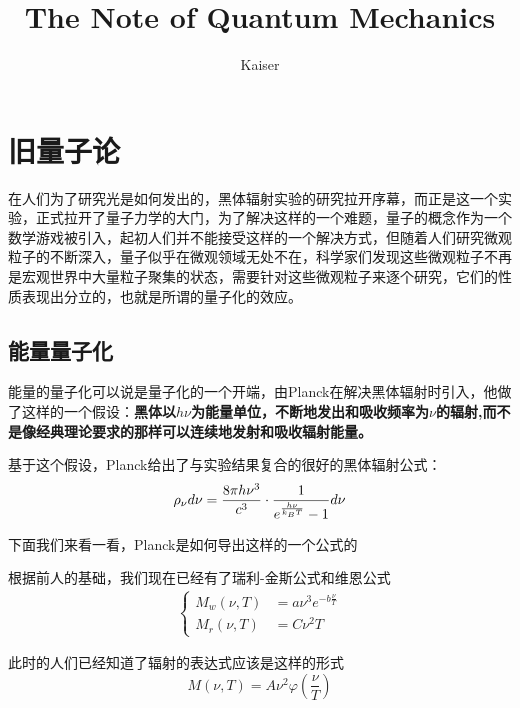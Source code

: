 \documentclass{article}
\title{The Note of Quantum Mechanics}
\author{Kaiser}
\begin{document}
\maketitle

\begin{center}
    \tableofcontents
\end{center}








\newpage





\section{旧量子论}




在人们为了研究光是如何发出的，黑体辐射实验的研究拉开序幕，而正是这一个实验，正式拉开了量子力学的大门，为了解决这样的一个难题，量子的概念作为一个数学游戏被引入，起初人们并不能接受这样的一个解决方式，但随着人们研究微观粒子的不断深入，量子似乎在微观领域无处不在，科学家们发现这些微观粒子不再是宏观世界中大量粒子聚集的状态，需要针对这些微观粒子来逐个研究，它们的性质表现出分立的，也就是所谓的量子化的效应。

\subsection{能量量子化}
能量的量子化可以说是量子化的一个开端，由Planck在解决黑体辐射时引入，他做了这样的一个假设：\textbf{黑体以}$h\nu$\textbf{为能量单位，不断地发出和吸收频率为}$\nu$\textbf{的辐射,而不是像经典理论要求的那样可以连续地发射和吸收辐射能量。}

基于这个假设，Planck给出了与实验结果复合的很好的黑体辐射公式：
\[\rho_\nu d\nu=\frac{8\pi h\nu^3}{c^3}\cdot \frac{1}{e^{\frac{h\nu}{k_{\tiny{B}}T}}-1}d\nu\]

下面我们来看一看，Planck是如何导出这样的一个公式的

根据前人的基础，我们现在已经有了瑞利-金斯公式和维恩公式
\begin{align*}
    \begin{cases}
        M_w(\nu,T) & =a\nu^3e^{-b\frac{\nu}{T}} \\
        M_r(\nu,T) & =C\nu^2T
    \end{cases}
\end{align*}

此时的人们已经知道了辐射的表达式应该是这样的形式
\[M(\nu,T)=A\nu^2\varphi(\frac{\nu}{T})\]
\end{document}
